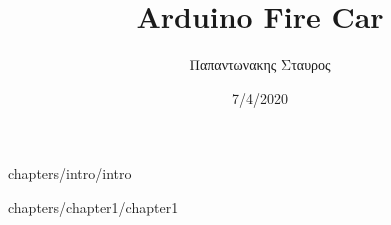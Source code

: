 \documentclass[a4paper,12pt]{article}
\author{Παπαντωνακης Σταυρος}
\title {Arduino Fire Car}
\date{7/4/2020}
\begin{document}
	
	
		
	\tableofcontents		
	\newpage
	 {chapters/intro/intro}
	
	 {chapters/chapter1/chapter1}
\end{document}
